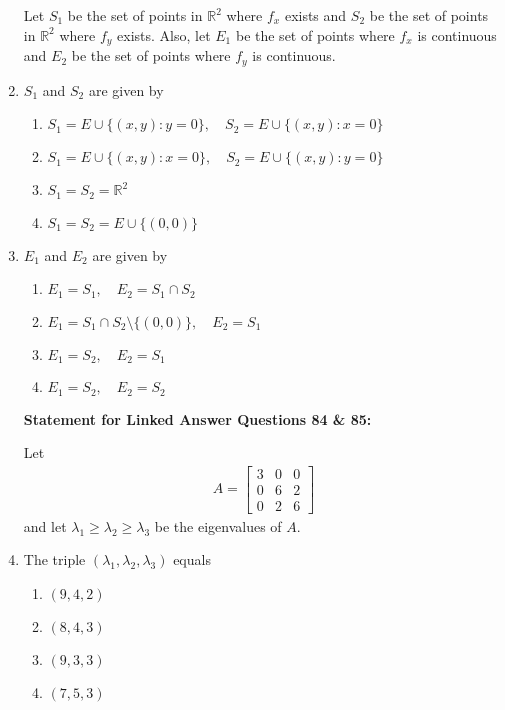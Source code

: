 \documentclass[journal]{IEEEtran}
\newcommand{\myvec}[1]{\begin{bmatrix}#1\end{bmatrix}}
\numberwithin{equation}{enumi}
\numberwithin{figure}{enumi}
\begin{document}
\begin{enumerate}
Let $S_1$ be the set of points in $\mathbb{R}^2$ where $f_x$ exists and $S_2$ be the set of points in $\mathbb{R}^2$ where $f_y$ exists. Also, let $E_1$ be the set of points where $f_x$ is continuous and $E_2$ be the set of points where $f_y$ is continuous.

\item $S_1$ and $S_2$ are given by      \hfill{}
\begin{enumerate}
    \item $S_1 = E \cup \{(x, y): y = 0\},\quad S_2 = E \cup \{(x, y): x = 0\}$
    \item $S_1 = E \cup \{(x, y): x = 0\},\quad S_2 = E \cup \{(x, y): y = 0\}$
    \item $S_1 = S_2 = \mathbb{R}^2$
    \item $S_1 = S_2 = E \cup \{(0, 0)\}$
\end{enumerate}




\item $E_1$ and $E_2$ are given by      \hfill{}

\begin{enumerate}
    \item $E_1 = S_1,\quad E_2 = S_1 \cap S_2$
    \item $E_1 = S_1 \cap S_2 \setminus \{(0,0)\},\quad E_2 = S_1$
    \item $E_1 = S_2,\quad E_2 = S_1$
    \item $E_1 = S_2,\quad E_2 = S_2$
\end{enumerate}

\newpage

\textbf{Statement for Linked Answer Questions 84 \& 85:}

Let
\begin{align*}
A = \myvec{
3 & 0 & 0 \\
0 & 6 & 2 \\
0 & 2 & 6
}
\end{align*}
and let $\lambda_1 \geq \lambda_2 \geq \lambda_3$ be the eigenvalues of $A$.

\item The triple $(\lambda_1, \lambda_2, \lambda_3)$ equals    \hfill{}
\begin{multicols}{2}
    \begin{enumerate}
        \item $(9, 4, 2)$
        \item $(8, 4, 3)$
        \item $(9, 3, 3)$
        \item $(7, 5, 3)$
    \end{enumerate}
    \end{multicols}





\end{enumerate}
\end{document}
